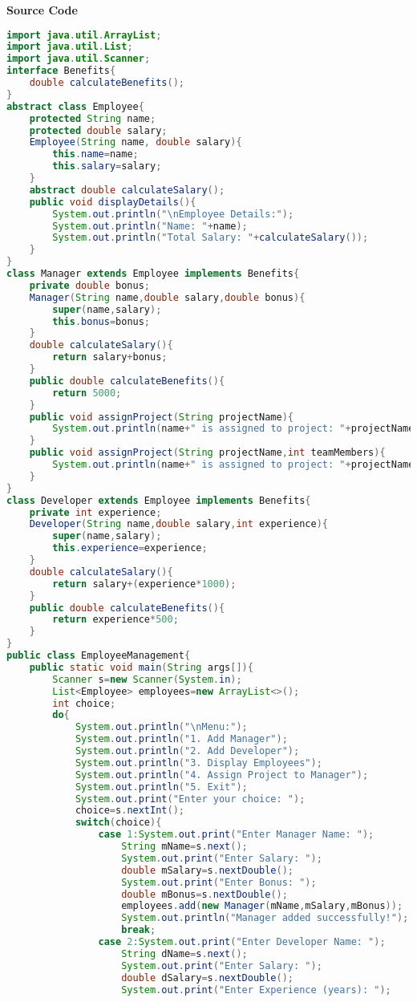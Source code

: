 \vspace{0.5cm}
\textbf{Source Code}
\begin{lstlisting}[language=Java]
import java.util.ArrayList;
import java.util.List;
import java.util.Scanner;
interface Benefits{
	double calculateBenefits();
}
abstract class Employee{
	protected String name;
	protected double salary;
	Employee(String name, double salary){
		this.name=name;
		this.salary=salary;
	}
	abstract double calculateSalary();
	public void displayDetails(){
		System.out.println("\nEmployee Details:");
		System.out.println("Name: "+name);
		System.out.println("Total Salary: "+calculateSalary());
	}
}
class Manager extends Employee implements Benefits{
	private double bonus;
	Manager(String name,double salary,double bonus){
		super(name,salary);
		this.bonus=bonus;
	}
	double calculateSalary(){
		return salary+bonus;
	}
	public double calculateBenefits(){
		return 5000;
	}
	public void assignProject(String projectName){
		System.out.println(name+" is assigned to project: "+projectName);
	}
	public void assignProject(String projectName,int teamMembers){
		System.out.println(name+" is assigned to project: "+projectName+" with "+teamMembers+" team members.");
	}
}
class Developer extends Employee implements Benefits{
	private int experience;
	Developer(String name,double salary,int experience){
		super(name,salary);
		this.experience=experience;
	}
	double calculateSalary(){
		return salary+(experience*1000);
	}
	public double calculateBenefits(){
		return experience*500;
	}
}
public class EmployeeManagement{
	public static void main(String args[]){
		Scanner s=new Scanner(System.in);
		List<Employee> employees=new ArrayList<>();
		int choice;
		do{
			System.out.println("\nMenu:");
			System.out.println("1. Add Manager");
			System.out.println("2. Add Developer");
			System.out.println("3. Display Employees");
			System.out.println("4. Assign Project to Manager");
			System.out.println("5. Exit");
			System.out.print("Enter your choice: ");
			choice=s.nextInt();
			switch(choice){
				case 1:System.out.print("Enter Manager Name: ");
					String mName=s.next();
					System.out.print("Enter Salary: ");
					double mSalary=s.nextDouble();
					System.out.print("Enter Bonus: ");
					double mBonus=s.nextDouble();
					employees.add(new Manager(mName,mSalary,mBonus));
					System.out.println("Manager added successfully!");
					break;
				case 2:System.out.print("Enter Developer Name: ");
					String dName=s.next();
					System.out.print("Enter Salary: ");
					double dSalary=s.nextDouble();
					System.out.print("Enter Experience (years): ");

\end{lstlisting}
